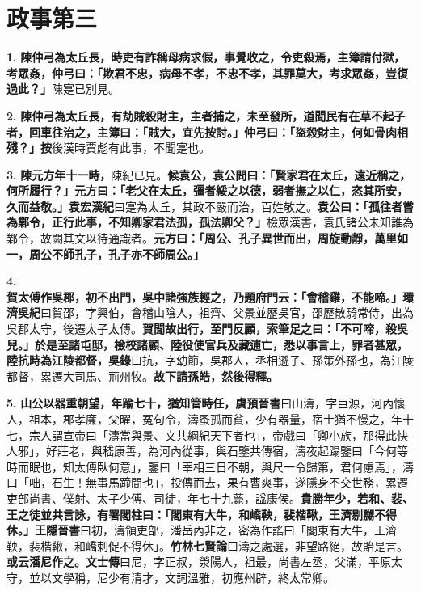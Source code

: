 \chapter{政事第三}

\textbf{1.} \textbf{陳仲弓為太丘長，時吏有詐稱母病求假，事覺收之，令吏殺焉，主簿請付獄，考眾姦，仲弓曰：「欺君不忠，病母不孝，不忠不孝，其罪莫大，考求眾姦，豈復過此？」}{\footnotesize 陳寔已別見。}

\textbf{2.} \textbf{陳仲弓為太丘長，有劫賊殺財主，主者捕之，未至發所，道聞民有在草不起子者，回車往治之，主簿曰：「賊大，宜先按討。」仲弓曰：「盜殺財主，何如骨肉相殘？」}{\footnotesize \textbf{按}後漢時賈彪有此事，不聞寔也。}

\textbf{3.} \textbf{陳元方年十一時，}{\footnotesize 陳紀已見。}\textbf{候袁公，袁公問曰：「賢家君在太丘，遠近稱之，何所履行？」元方曰：「老父在太丘，彊者綏之以德，弱者撫之以仁，恣其所安，久而益敬。」}{\footnotesize \textbf{袁宏漢紀}曰寔為太丘，其政不嚴而治，百姓敬之。}\textbf{袁公曰：「孤往者嘗為鄴令，正行此事，不知卿家君法孤，孤法卿父？」}{\footnotesize 檢眾漢書，袁氏諸公未知誰為鄴令，故闕其文以待通識者。}\textbf{元方曰：「周公、孔子異世而出，周旋動靜，萬里如一，周公不師孔子，孔子亦不師周公。」}

\textbf{4.} \textbf{賀太傅作吳郡，初不出門，吳中諸強族輕之，乃題府門云：「會稽雞，不能啼。」}{\footnotesize \textbf{環濟吳紀}曰賀邵，字興伯，會稽山陰人，祖齊、父景並歷吳官，邵歷散騎常侍，出為吳郡太守，後遷太子太傅。}\textbf{賀聞故出行，至門反顧，索筆足之曰：「不可啼，殺吳兒。」於是至諸屯邸，檢校諸顧、陸役使官兵及藏逋亡，悉以事言上，罪者甚眾，陸抗時為江陵都督，}{\footnotesize \textbf{吳錄}曰抗，字幼節，吳郡人，丞相遜子、孫策外孫也，為江陵都督，累遷大司馬、荊州牧。}\textbf{故下請孫皓，然後得釋。}

\textbf{5.} \textbf{山公以器重朝望，年踰七十，猶知管時任，}{\footnotesize \textbf{虞預晉書}曰山濤，字巨源，河內懷人，祖本，郡孝廉，父曜，冤句令，濤蚤孤而貧，少有器量，宿士猶不慢之，年十七，宗人謂宣帝曰「濤當與景、文共綱紀天下者也」，帝戲曰「卿小族，那得此快人邪」，好莊老，與嵇康善，為河內從事，與石鑒共傳宿，濤夜起蹋鑒曰「今何等時而眠也，知太傅臥何意」，鑒曰「宰相三日不朝，與尺一令歸第，君何慮焉」，濤曰「咄，石生！無事馬蹄間也」，投傳而去，果有曹爽事，遂隱身不交世務，累遷吏部尚書、僕射、太子少傅、司徒，年七十九薨，諡康侯。}\textbf{貴勝年少，若和、裴、王之徒並共言詠，有署閣柱曰：「閣東有大牛，和嶠鞅，裴楷鞦，王濟剔嬲不得休。」}{\footnotesize \textbf{王隱晉書}曰初，濤領吏部，潘岳內非之，密為作謠曰「閣東有大牛，王濟鞅，裴楷鞦，和嶠刺促不得休」。\textbf{竹林七賢論}曰濤之處選，非望路絕，故貽是言。}\textbf{或云潘尼作之。}{\footnotesize \textbf{文士傳}曰尼，字正叔，滎陽人，祖最，尚書左丞，父滿，平原太守，並以文學稱，尼少有清才，文詞溫雅，初應州辟，終太常卿。}

